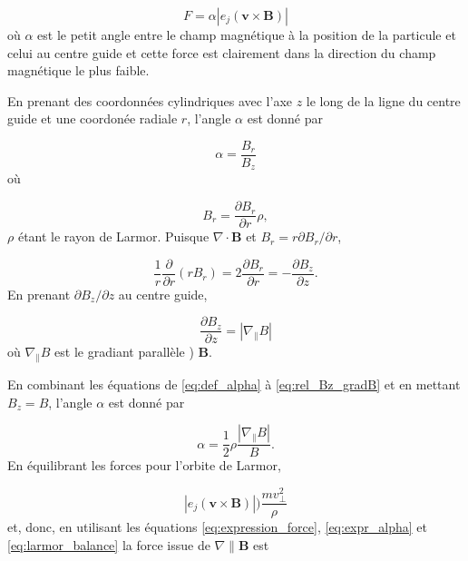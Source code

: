 \documentclass[main.tex]{subfiles}
\begin{document}
\begin{equation}
	F = \alpha\left\vert e_j \left( \bm{v} \times \bm{B} \right) \right\vert
	\label{eq:expression_force}
\end{equation}
où \( \alpha \) est le petit angle entre le champ magnétique à la position de la particule et celui au centre guide et cette force est clairement dans la direction du champ magnétique le plus faible.

En prenant des coordonnées cylindriques avec l'axe \( z \) le long de la ligne du centre guide et une coordonée radiale \( r \), l'angle \( \alpha \) est donné par

\begin{equation}
	\alpha = \frac{B_r}{B_z}
	\label{eq:def_alpha}
\end{equation}
où

\begin{equation}
	B_r = \frac{\partial B_r}{\partial r} \rho,
	\label{eq:def_Br}
\end{equation}
\( \rho \) étant le rayon de Larmor. Puisque \( \nabla \cdot \bm{B} \) et \( B_r = r \partial B_r / \partial r \),

\begin{equation}
	\frac{1}{r} \frac{\partial}{\partial r} \left( r B_r \right) = 2 \frac{\partial B_r}{\partial r} = - \frac{\partial B_z}{\partial z}.
	\label{eq:relation_Br_Bz}
\end{equation}
En prenant \( \partial B_z / \partial z \) au centre guide,

\begin{equation}
	\frac{\partial B_z}{\partial z} = \left\vert \nabla_\parallel B \right\vert
	\label{eq:rel_Bz_gradB}
\end{equation}
où \( \nabla_\parallel B  \) est le gradiant parallèle ) \( \bm{B} \).

En combinant les équations de \ref{eq:def_alpha} à \ref{eq:rel_Bz_gradB} et en mettant \( B_z = B \), l'angle \( \alpha \) est donné par

\begin{equation}
	\alpha = \frac{1}{2} \rho \frac{\left\vert \nabla_\parallel B \right\vert}{B}.
	\label{eq:expr_alpha}
\end{equation}
En équilibrant les forces pour l'orbite de Larmor,

\begin{equation}
	\left\vert e_j \left( \bm{v} \times \bm{B} \right) \right\vert ) \frac{m v_\perp^2}{\rho}
	\label{eq:larmor_balance}
\end{equation}
et, donc, en utilisant les équations \ref{eq:expression_force}, \ref{eq:expr_alpha} et \ref{eq:larmor_balance} la force issue de \( \nabla\parallel \bm{B} \) est
\end{document}
